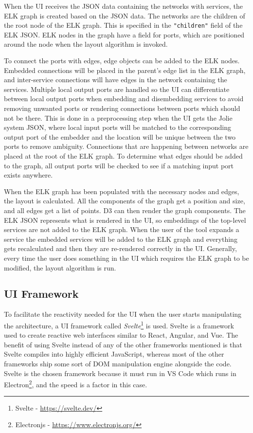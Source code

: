 When the UI receives the JSON data containing the networks with services, the ELK graph is created based on the JSON data.
The networks are the children of the root node of the ELK graph. This is specified in the \texttt{"children"} field of the ELK JSON.
ELK nodes in the graph have a field for ports, which are positioned around the node when the layout algorithm is invoked.

To connect the ports with edges, edge objects can be added to the ELK nodes. Embedded connections will be placed in the parent's edge list in the ELK graph, and inter-service connections will have edges in the network containing the services.
Multiple local output ports are handled so the UI can differentiate between local output ports when embedding and disembedding services to avoid removing unwanted ports or rendering connections between ports which should not be there.
This is done in a preprocessing step when the UI gets the Jolie system JSON, where local input ports will be matched to the corresponding output port of the embedder and the location will be unique between the two ports to remove ambiguity.
Connections that are happening between networks are placed at the root of the ELK graph. To determine what edges should be added to the graph, all output ports will be checked to see if a matching input port exists anywhere.

When the ELK graph has been populated with the necessary nodes and edges, the layout is calculated. All the components of the graph get a position and size, and all edges get a list of points. D3 can then render the graph components.
The ELK JSON represents what is rendered in the UI, so embeddings of the top-level services are not added to the ELK graph. When the user of the tool expands a service the embedded services will be added to the ELK graph and
everything gets recalculated and then they are re-rendered correctly in the UI. Generally, every time the user does something in the UI which requires the ELK graph to be modified, the layout algorithm is run.

\subsection{UI Framework}
To facilitate the reactivity needed for the UI when the user starts manipulating the architecture, a UI framework called \textit{Svelte}\footnote{Svelte - \url{https://svelte.dev/}} is used.
Svelte is a framework used to create reactive web interfaces similar to React, Angular, and Vue. The benefit of using Svelte instead of any of the other frameworks mentioned is that Svelte compiles into highly efficient JavaScript,
whereas most of the other frameworks ship some sort of DOM manipulation engine alongside the code. Svelte is the chosen framework because it must run in VS Code which runs in Electron\footnote{Electronjs - \url{https://www.electronjs.org/}}, and the speed is a factor in this case.

